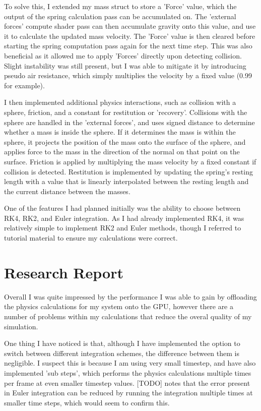 \documentclass[]{acmsiggraph}
\begin{document}
To solve this, I extended my mass struct to store a 'Force' value, which the output of the spring calculation pass can be accumulated on. The 'external forces' compute shader pass can then accumulate gravity onto this value, and use it to calculate the updated mass velocity. The 'Force' value is then cleared before starting the spring computation pass again for the next time step. This was also beneficial as it allowed me to apply 'Forces' directly upon detecting collision. Slight instability was still present, but I was able to mitigate it by introducing pseudo air resistance, which simply multiplies the velocity by a fixed value (0.99 for example).

I then implemented additional physics interactions, such as collision with a sphere, friction, and a constant for restitution or 'recovery'. Collisions with the sphere are handled in the 'external forces', and uses signed distance to determine whether a mass is inside the sphere. If it determines the mass is within the sphere, it projects the position of the mass onto the surface of the sphere, and applies force to the mass in the direction of the normal on that point on the surface. Friction is applied by multiplying the mass velocity by a fixed constant if collision is detected. Restitution is implemented by updating the spring's resting length with a value that is linearly interpolated between the resting length and the current distance between the masses.

One of the features I had planned initially was the ability to choose between RK4, RK2, and Euler integration. As I had already implemented RK4, it was relatively simple to implement RK2 and Euler methods, though I referred to tutorial material \cite{TODO} to ensure my calculations were correct.

\section{Research Report} \label{sec:report}

Overall I was quite impressed by the performance I was able to gain by offloading the physics calculations for my system onto the GPU, however there are a number of problems within my calculations that reduce the overal quality of my simulation.

One thing I have noticed is that, although I have implemented the option to switch between different integration schemes, the difference between them is negligible. I suspect this is because I am using very small timestep, and have also implemented 'sub steps', which performs the physics calculations multiple times per frame at even smaller timestep values.
[TODO] notes that the error present in Euler integration can be reduced by running the integration multiple times at smaller time steps, which would seem to confirm this.
\end{document}

